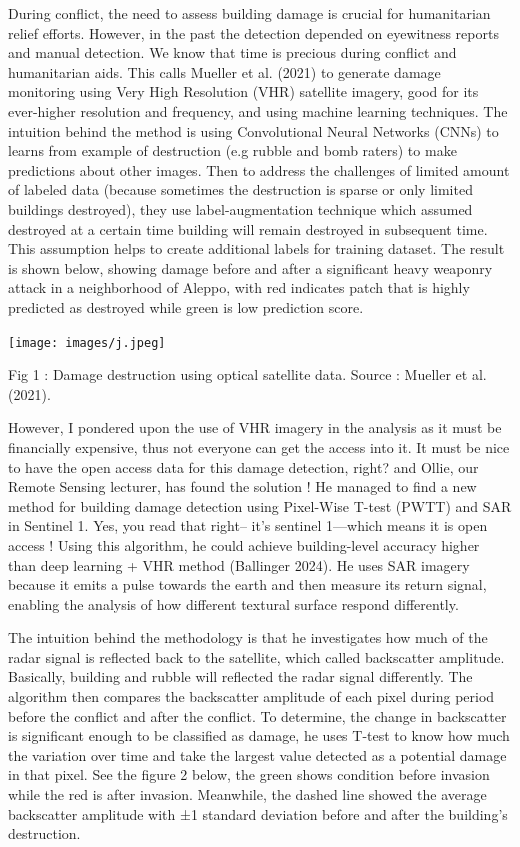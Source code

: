 \documentclass[
  letterpaper,
  DIV=11,
  numbers=noendperiod]{scrreprt}
\begin{document}
During conflict, the need to assess building damage is crucial for
humanitarian relief efforts. However, in the past the detection depended
on eyewitness reports and manual detection. We know that time is
precious during conflict and humanitarian aids. This calls Mueller et
al. (2021) to generate damage monitoring using Very High Resolution
(VHR) satellite imagery, good for its ever-higher resolution and
frequency, and using machine learning techniques. The intuition behind
the method is using Convolutional Neural Networks (CNNs) to learns from
example of destruction (e.g rubble and bomb raters) to make predictions
about other images. Then to address the challenges of limited amount of
labeled data (because sometimes the destruction is sparse or only
limited buildings destroyed), they use label-augmentation technique
which assumed destroyed at a certain time building will remain destroyed
in subsequent time. This assumption helps to create additional labels
for training dataset. The result is shown below, showing damage before
and after a significant heavy weaponry attack in a neighborhood of
Aleppo, with red indicates patch that is highly predicted as destroyed
while green is low prediction score.

\texttt{[image: images/j.jpeg]}

Fig 1 : Damage destruction using optical satellite data. Source :
Mueller et al. (2021).

However, I pondered upon the use of VHR imagery in the analysis as it
must be financially expensive, thus not everyone can get the access into
it. It must be nice to have the open access data for this damage
detection, right? and Ollie, our Remote Sensing lecturer, has found the
solution ! He managed to find a new method for building damage detection
using Pixel-Wise T-test (PWTT) and SAR in Sentinel 1. Yes, you read that
right-- it's sentinel 1---which means it is open access ! Using this
algorithm, he could achieve building-level accuracy higher than deep
learning + VHR method (Ballinger 2024). He uses SAR imagery because it
emits a pulse towards the earth and then measure its return signal,
enabling the analysis of how different textural surface respond
differently.

The intuition behind the methodology is that he investigates how much of
the radar signal is reflected back to the satellite, which called
backscatter amplitude. Basically, building and rubble will reflected the
radar signal differently. The algorithm then compares the backscatter
amplitude of each pixel during period before the conflict and after the
conflict. To determine, the change in backscatter is significant enough
to be classified as damage, he uses T-test to know how much the
variation over time and take the largest value detected as a potential
damage in that pixel. See the figure 2 below, the green shows condition
before invasion while the red is after invasion. Meanwhile, the dashed
line showed the average backscatter amplitude with ±1 standard deviation
before and after the building's destruction.
\end{document}
